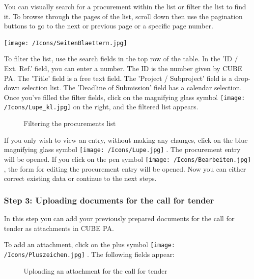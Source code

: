 \vspace{\baselineskip}

You can visually search for a procurement within the list or filter the list to find it. To browse through the pages of the list, scroll down then use the pagination buttons to go to the next or previous page or a specific page number.

\begin{center}
\texttt{[image: /Icons/SeitenBlaettern.jpg]}
\end{center}

To filter the list, use the search fields in the top row of the table. In the 'ID / Ext. Ref.' field, you can enter a number. The ID is the number given by CUBE PA. The 'Title' field is a free text field. The 'Project / Subproject' field is a drop-down selection list. The 'Deadline of Submission' field has a calendar selection. Once you've filled the filter fields, click on the magnifying glass symbol \texttt{[image: /Icons/Lupe\_kl.jpg]}  on the right, and the filtered list appears.

\begin{figure}[H]
\caption{Filtering the procurements list}
\end{figure}

If you only wish to view an entry, without making any changes, click on the blue magnifying glass symbol \texttt{[image: /Icons/Lupe.jpg]} . The procurement entry will be opened. If you click on the pen symbol \texttt{[image: /Icons/Bearbeiten.jpg]} , the form for editing the procurement entry will be opened.\textcolor{red}{ } Now you can either correct existing data or continue to the next steps.

\subsubsection{Step 3: Uploading documents for the call for tender}

In this step you can add your previously prepared documents for the call for tender as attachments in CUBE PA.

\vspace{\baselineskip}

To add an attachment, click on the plus symbol \texttt{[image: /Icons/Pluszeichen.jpg]} . The following fields appear:

\begin{figure}[H]
\caption{Uploading an attachment for the call for tender}
\end{figure}

